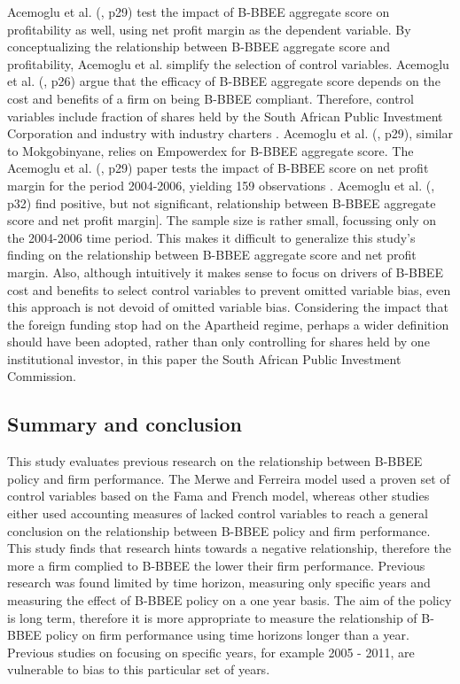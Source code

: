 Acemoglu et al. (\citeyear{N23}, p29) test the impact of B-BBEE aggregate score on profitability as well, using net profit margin as the dependent variable. By conceptualizing the relationship between B-BBEE aggregate score and profitability, Acemoglu et al. simplify the selection of control variables. Acemoglu et al. (\citeyear{N23}, p26) argue that the efficacy of B-BBEE aggregate score depends on the cost and benefits of a firm on being B-BBEE compliant. Therefore, control variables include fraction of shares held by the South African Public Investment Corporation and industry with industry charters \cite[p27]{N23}. Acemoglu et al. (\citeyear{N23}, p29), similar to Mokgobinyane, relies on Empowerdex for B-BBEE aggregate score. The Acemoglu et al. (\citeyear{N23}, p29) paper tests the impact of B-BBEE score on net profit margin for the period 2004-2006, yielding 159 observations . Acemoglu et al. (\citeyear{N23}, p32) find positive, but not significant, relationship between B-BBEE aggregate score and net profit margin]. The sample size is rather small, focussing only on the 2004-2006 time period. This makes it difficult to generalize this study’s finding on the relationship between B-BBEE aggregate score and net profit margin. Also, although intuitively it makes sense to focus on drivers of B-BBEE cost and benefits to select control variables to prevent omitted variable bias, even this approach is not devoid of omitted variable bias. Considering the impact that the foreign funding stop had on the Apartheid regime, perhaps a wider definition should have been adopted, rather than only controlling for shares held by one institutional investor, in this paper the South African Public Investment Commission. 
\subsection{Summary and conclusion}
This study evaluates previous research on the relationship between B-BBEE policy and firm performance. The Merwe and Ferreira model used a proven set of control variables based on the Fama and French model, whereas other studies either used accounting measures of lacked control variables to reach a general conclusion on the relationship between B-BBEE policy and firm performance. This study finds that research hints towards a negative relationship, therefore the more a firm complied to B-BBEE the lower their firm performance. Previous research was found limited by time horizon, measuring only specific years and measuring the effect of B-BBEE policy on a one year basis. The aim of the policy is long term, therefore it is more appropriate to measure the relationship of B-BBEE policy on firm performance using time horizons longer than a year. Previous studies on focusing on specific years, for example 2005 - 2011, are vulnerable to bias to this particular set of years.
